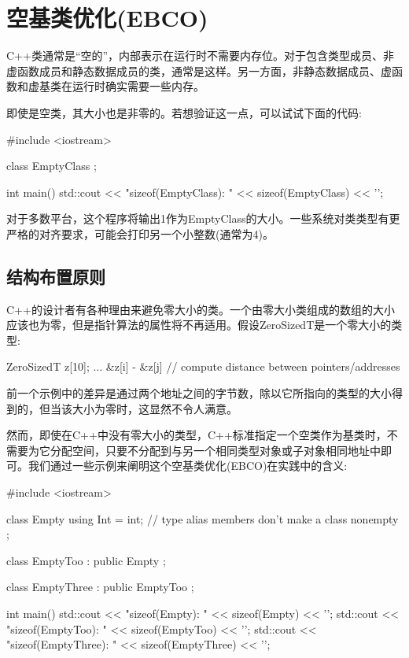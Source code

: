\section{空基类优化(EBCO)}

C++类通常是“空的”，内部表示在运行时不需要内存位。对于包含类型成员、非虚函数成员和静态数据成员的类，通常是这样。另一方面，非静态数据成员、虚函数和虚基类在运行时确实需要一些内存。

即使是空类，其大小也是非零的。若想验证这一点，可以试试下面的代码:

\begin{cpp}
#include <iostream>

class EmptyClass {
};

int main()
{
	std::cout << "sizeof(EmptyClass): " << sizeof(EmptyClass) << '\n';
}
\end{cpp}

对于多数平台，这个程序将输出1作为EmptyClass的大小。一些系统对类类型有更严格的对齐要求，可能会打印另一个小整数(通常为4)。

\subsection{结构布置原则}

C++的设计者有各种理由来避免零大小的类。一个由零大小类组成的数组的大小应该也为零，但是指针算法的属性将不再适用。假设ZeroSizedT是一个零大小的类型:

\begin{cpp}
ZeroSizedT z[10];
...
&z[i] - &z[j] // compute distance between pointers/addresses
\end{cpp}

前一个示例中的差异是通过两个地址之间的字节数，除以它所指向的类型的大小得到的，但当该大小为零时，这显然不令人满意。

然而，即使在C++中没有零大小的类型，C++标准指定一个空类作为基类时，不需要为它分配空间，只要不分配到与另一个相同类型对象或子对象相同地址中即可。我们通过一些示例来阐明这个空基类优化(EBCO)在实践中的含义:

\begin{cpp}
#include <iostream>

class Empty {
	using Int = int; // type alias members don't make a class nonempty
};

class EmptyToo : public Empty {
};

class EmptyThree : public EmptyToo {
};

int main()
{
	std::cout << "sizeof(Empty): " << sizeof(Empty) << '\n';
	std::cout << "sizeof(EmptyToo): " << sizeof(EmptyToo) << '\n';
	std::cout << "sizeof(EmptyThree): " << sizeof(EmptyThree) << '\n';
}
\end{cpp}

